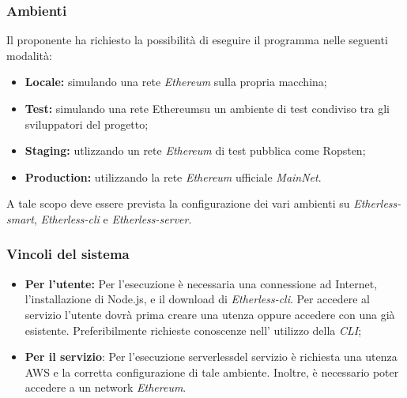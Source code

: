 \subsubsection{Ambienti}
Il proponente ha richiesto la possibilità di eseguire il programma nelle seguenti modalità:
\begin{itemize}
	\item \textbf{Locale:} simulando una rete \textit{Ethereum\glo} sulla propria macchina;
	\item \textbf{Test:} simulando una rete Ethereum\glo su un ambiente di test condiviso tra gli sviluppatori del progetto;
	\item \textbf{Staging:} utlizzando un rete \textit{Ethereum\glo} di test pubblica come Ropsten;
	\item \textbf{Production:} utilizzando la rete \textit{Ethereum\glo} ufficiale \textit{MainNet\glos}.
\end{itemize}
A tale scopo deve essere prevista la configurazione dei vari ambienti su \textit{Etherless-smart}, \textit{Etherless-cli} e \textit{Etherless-server}.

\subsubsection{Vincoli del sistema}
\begin{itemize}
	\item \textbf{Per l'utente:} Per l'esecuzione è necessaria una connessione ad Internet, l'installazione di Node.js, e il download di \textit{Etherless-cli}. Per accedere al servizio l'utente dovrà prima creare una utenza oppure accedere con una già esistente. Preferibilmente richieste conoscenze nell' utilizzo della \textit{CLI\glos};
	\item \textbf{Per il servizio}: Per l'esecuzione serverless\glo del servizio è richiesta una utenza AWS e la corretta configurazione di tale ambiente. Inoltre, è necessario poter accedere a un network \textit{Ethereum\glos}.
\end{itemize}

	